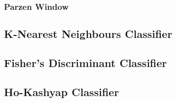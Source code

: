\documentclass[11pt, oneside]{article}   	%
\begin{document}
\subsubsection*{Parzen Window}
\subsection{K-Nearest Neighbours Classifier}
\subsection{Fisher's Discriminant Classifier}
\subsection{Ho-Kashyap Classifier}
%
\end{document}
